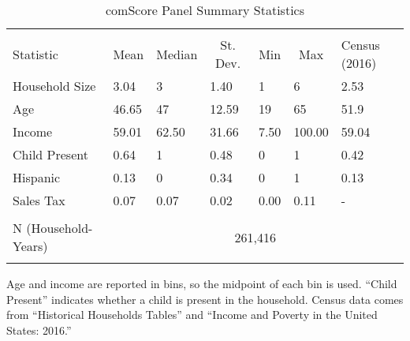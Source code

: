 
\begin{table}[!htbp] \centering
  \caption{comScore Panel Summary Statistics}
  \label{tab:comScorePanel}
\begin{tabularx}{\textwidth}{lXXXXXX}
\\[-1.8ex]\hline
\hline \\[-1.8ex]
Statistic & \multicolumn{1}{c}{Mean} & \multicolumn{1}{c}{Median} & \multicolumn{1}{c}{St. Dev.} & \multicolumn{1}{c}{Min} & \multicolumn{1}{c}{Max} & Census (2016) \\
\hline
Household Size  & 3.04  & 3     & 1.40  & 1     & 6       & 2.53 \\
Age             & 46.65 & 47    & 12.59 & 19    & 65      & 51.9\\
Income          & 59.01 & 62.50 & 31.66 & 7.50  & 100.00  & 59.04 \\
Child Present   & 0.64  & 1     & 0.48  & 0     & 1       & 0.42 \\
Hispanic        & 0.13  & 0     & 0.34  & 0     & 1       & 0.13\\
Sales Tax       & 0.07  & 0.07  & 0.02  & 0.00  & 0.11    & - \\
\hline \\[-1.8ex]
N (Household-Years) & \multicolumn{6}{c}{261,416} \\
\hline \\[-1.8ex]
\end{tabularx}
\begin{tablenotes}
Age and income are reported in bins, so the midpoint of each bin is used. ``Child Present'' indicates whether a child is present in the household. Census data comes from ``Historical Households Tables'' and ``Income and Poverty in the United States: 2016.''
\end{tablenotes}
\end{table}
